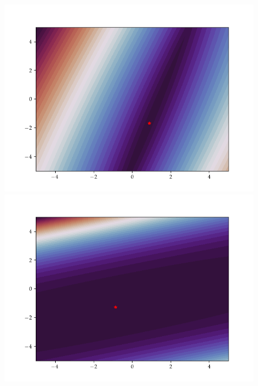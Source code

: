   \begin{figure}[h]
    \centering
    \begin{minipage}[b]{0.32\textwidth}
     \includegraphics[trim=2.5cm 1.3cm 2.5cm 1.3cm,clip,width=\textwidth]{Figures/coco/f13.png}
    \end{minipage}
    \hfill
    \begin{minipage}[b]{0.32\textwidth}
     \includegraphics[trim=2.5cm 1.3cm 2.5cm 1.3cm,clip,width=\textwidth]{Figures/coco/f14.png}
    \end{minipage}
    \hfill
    \begin{minipage}[b]{0.32\textwidth}

\end{minipage}
\end{figure}
